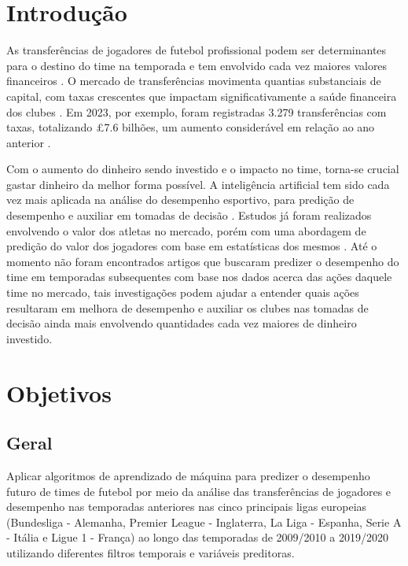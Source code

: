 \documentclass[a4paper]{article}
\theoremstyle{plain}
\theoremstyle{definition}
\begin{document}
\section{Introdução}
As transferências de jogadores de futebol profissional podem ser determinantes para o destino do time na temporada e tem envolvido cada vez maiores valores financeiros  \cite{ECA_TransferSystemEurope_2013}. O mercado de transferências movimenta quantias substanciais de capital, com taxas crescentes que impactam significativamente a saúde financeira dos clubes \cite{veliz_predicting_2025}. Em 2023, por exemplo, foram registradas 3.279 transferências com taxas, totalizando £7.6 bilhões, um aumento considerável em relação ao ano anterior \cite{fifa_global_transfer_2023}.

Com o aumento do dinheiro sendo investido e o impacto no time, torna-se crucial gastar dinheiro da melhor forma possível. A inteligência artificial tem sido cada vez mais aplicada na análise do desempenho esportivo, para predição de desempenho e auxiliar em tomadas de decisão \cite{claudino2019current}. Estudos já foram realizados envolvendo o valor dos atletas no mercado, porém com uma abordagem de predição do valor dos jogadores com base em estatísticas dos mesmos \cite{shen_predicting_2025}. Até o momento não foram encontrados artigos que buscaram predizer o desempenho do time em temporadas subsequentes com base nos dados acerca das ações daquele time no mercado, tais investigações podem ajudar a entender quais ações resultaram em melhora de desempenho e auxiliar os clubes nas tomadas de decisão ainda mais envolvendo quantidades cada vez maiores de dinheiro investido.



\section{Objetivos}
\subsection{Geral}
Aplicar algoritmos de aprendizado de máquina para predizer o desempenho futuro de times de futebol por meio da análise das transferências de jogadores e desempenho nas temporadas anteriores nas cinco principais ligas europeias (Bundesliga - Alemanha, Premier League - Inglaterra, La Liga - Espanha, Serie A - Itália e Ligue 1 - França) ao longo das temporadas de 2009/2010 a 2019/2020 utilizando diferentes filtros temporais e variáveis preditoras. 
\end{document}
